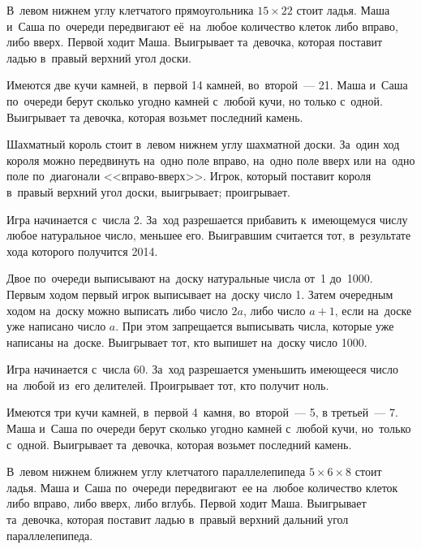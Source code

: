 \begin{problems}

\item
В~левом нижнем углу клетчатого прямоугольника $15 \times 22$ стоит ладья.
Маша и~Саша по~очереди передвигают её~на~любое количество клеток либо вправо,
либо вверх.
Первой ходит Маша.
Выигрывает та~девочка, которая поставит ладью в~правый верхний угол доски.

\item
Имеются две кучи камней, в~первой 14 камней, во~второй~--- 21.
Маша и~Саша по~очереди берут сколько угодно камней с~любой кучи, но только
с~одной.
Выигрывает та девочка, которая возьмет последний камень.

\item
Шахматный король стоит в~левом нижнем углу шахматной доски.
За~один ход короля можно передвинуть на~одно поле вправо, на~одно поле вверх
или на~одно поле по~диагонали <<вправо-вверх>>.
Игрок, который поставит короля в~правый верхний угол доски,
\quad
\sbp выигрывает;
\quad
\sbp проигрывает.
\quad

\item
Игра начинается с~числа 2.
За~ход разрешается прибавить к~имеющемуся числу любое натуральное число,
меньшее его.
Выигравшим считается тот, в~результате хода которого получится 2014.

\item
Двое по~очереди выписывают на~доску натуральные числа от~1 до~1000.
Первым ходом первый игрок выписывает на~доску число 1.
Затем очередным ходом на~доску можно выписать либо число $2a$, либо число
$a + 1$, если на~доске уже написано число $a$.
При этом запрещается выписывать числа, которые уже написаны на~доске.
Выигрывает тот, кто выпишет на~доску число 1000.

\item
Игра начинается с~числа 60.
За~ход разрешается уменьшить имеющееся число на~любой из~его делителей.
Проигрывает тот, кто получит ноль.

\item
Имеются три кучи камней, в~первой 4~камня, во~второй~--- 5, в третьей~--- 7.
Маша и~Саша по очереди берут сколько угодно камней с~любой кучи, но~только
с~одной.
Выигрывает та~девочка, которая возьмет последний камень.

\item
В~левом нижнем ближнем углу клетчатого параллелепипеда $5 \times 6 \times 8$
стоит ладья.
Маша и~Саша по~очереди передвигают~ее на~любое количество клеток либо вправо,
либо вверх, либо вглубь.
Первой ходит Маша.
Выигрывает та~девочка, которая поставит ладью в~правый верхний дальний угол
параллелепипеда.

\end{problems}

